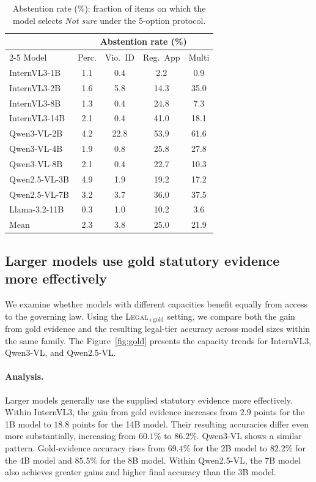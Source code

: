 \begin{table}[t]
\centering
\caption{Abstention rate (\%): fraction of items on which the model selects
\emph{Not sure} under the 5-option protocol.}
\label{tab:abstention}
\setlength{\tabcolsep}{6pt}
\begin{tabular}{lcccc}
\toprule
& \multicolumn{4}{c}{Abstention rate (\%)} \\
\cmidrule(lr){2-5}
Model & Perc. & Vio.\ ID & Reg.\ App & Multi \\
\midrule
InternVL3-1B    & 1.1 & \phantom{0}0.4 & \phantom{0}2.2 & \phantom{0}0.9 \\
InternVL3-2B    & 1.6 & \phantom{0}5.8 & 14.3 & 35.0 \\
InternVL3-8B    & 1.3 & \phantom{0}0.4 & 24.8 & \phantom{0}7.3 \\
InternVL3-14B   & 2.1 & \phantom{0}0.4 & 41.0 & 18.1 \\
Qwen3-VL-2B     & 4.2 & 22.8 & 53.9 & 61.6 \\
Qwen3-VL-4B     & 1.9 & \phantom{0}0.8 & 25.8 & 27.8 \\
Qwen3-VL-8B     & 2.1 & \phantom{0}0.4 & 22.7 & 10.3 \\
Qwen2.5-VL-3B   & 4.9 & \phantom{0}1.9 & 19.2 & 17.2 \\
Qwen2.5-VL-7B   & 3.2 & \phantom{0}3.7 & 36.0 & 37.5 \\
Llama-3.2-11B   & 0.3 & \phantom{0}1.0 & 10.2 & \phantom{0}3.6 \\
\midrule
Mean            & 2.3 & \phantom{0}3.8 & 25.0 & 21.9 \\
\bottomrule
\end{tabular}
\end{table}

\subsection{Larger models use gold statutory evidence more effectively}
\label{sec:small}
We examine whether models with different capacities benefit equally from access to the governing law. Using the \textsc{Legal}$_{+\text{gold}}$ setting, we compare both the gain from gold evidence and the resulting legal-tier accuracy across model sizes within the same family. The Figure~\ref{fig:gold} presents the capacity trends for InternVL3, Qwen3-VL, and Qwen2.5-VL.

\paragraph{Analysis.}
Larger models generally use the supplied statutory evidence more effectively. Within InternVL3, the gain from gold evidence increases from $2.9$ points for the 1B model to $18.8$ points for the 14B model. Their resulting accuracies differ even more substantially, increasing from $60.1\%$ to $86.2\%$. Qwen3-VL shows a similar pattern. Gold-evidence accuracy rises from $69.4\%$ for the 2B model to $82.2\%$ for the 4B model and $85.5\%$ for the 8B model. Within Qwen2.5-VL, the 7B model also achieves greater gains and higher final accuracy than the 3B model.


